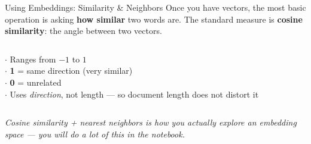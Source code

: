 \documentclass[aspectratio=169]{beamer}
\begin{document}

\begin{frame}{Using Embeddings: Similarity \& Neighbors}
\vspace{0.2cm}
{\small Once you have vectors, the most basic operation is asking \textbf{how similar} two
words are. The standard measure is \textbf{cosine similarity}: the angle between two vectors.}

\medskip
\begin{columns}[T]
  \vspace{0pt}
  {\small
  $\cdot$ Ranges from $-1$ to $1$\\[4pt]
  $\cdot$ \textbf{1} = same direction (very similar)\\[4pt]
  $\cdot$ \textbf{0} = unrelated\\[4pt]
  $\cdot$ Uses \emph{direction}, not length --- so document length does not distort it}

  \vspace{0pt}
\end{columns}

\medskip
{\small\textcolor{midgray}{\textit{Cosine similarity + nearest neighbors is how you actually
\emph{explore} an embedding space --- you will do a lot of this in the notebook.}}}
\end{frame}
\end{document}
